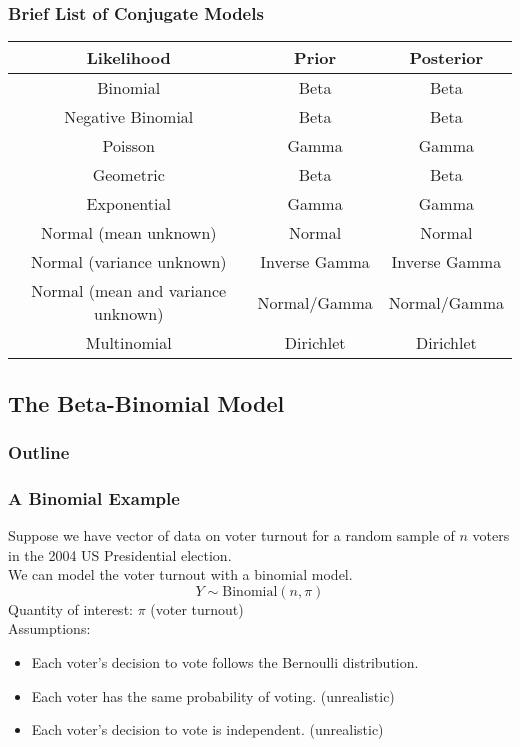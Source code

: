 \documentclass{beamer}
\begin{document}
\begin{frame}
\frametitle{Brief List of Conjugate Models}
\pause
\scriptsize
\begin{table}
\begin{center}
\begin{tabular}{c|c|c}
Likelihood & Prior & Posterior\\
\hline
Binomial & Beta & Beta\\
Negative Binomial & Beta & Beta\\
Poisson & Gamma & Gamma\\
Geometric & Beta & Beta\\
Exponential & Gamma & Gamma\\
Normal (mean unknown) & Normal & Normal\\
Normal (variance unknown) & Inverse Gamma & Inverse Gamma\\
Normal (mean and variance unknown) & Normal/Gamma & Normal/Gamma\\
Multinomial & Dirichlet & Dirichlet
\end{tabular}
\end{center}
\end{table}
\normalsize
\end{frame}

\subsection{The Beta-Binomial Model}

\begin{frame}
\frametitle{Outline}
\tableofcontents[currentsubsection]
\end{frame}


\begin{frame}
\frametitle{A Binomial Example}
\pause
Suppose we have vector of data on voter turnout for a random sample of $n$
voters in the 2004 US Presidential election.   \\
\pause
\bigskip
We can model the voter turnout with a binomial model.\\
\pause
\begin{equation*}
Y \sim \mathrm{Binomial}(n, \pi)
\end{equation*}
\pause
\bigskip
Quantity of interest: $\pi$ (voter turnout)\\
\pause
\bigskip
Assumptions:
\pause
\begin{itemize}
\item Each voter's decision to vote follows the Bernoulli
distribution. \pause
\item Each voter has the same probability of voting.  \pause
(unrealistic) \pause
\item Each voter's decision to vote is independent.  \pause (unrealistic)
\end{itemize}
\end{frame}
\end{document}
